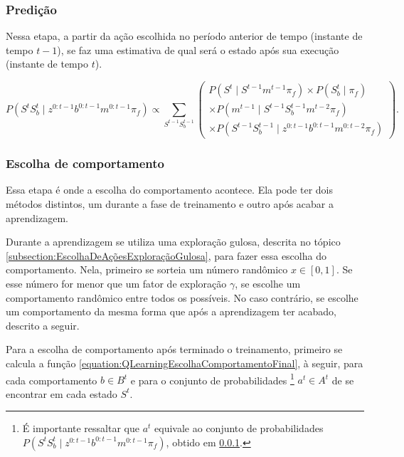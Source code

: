 \subsubsection{Predição} \label{subsubsection:ModeloFinalPredicao}

Nessa etapa, a partir da ação escolhida no período anterior de tempo (instante de tempo $ t-1 $), se faz uma estimativa de qual será o estado após sua execução (instante de tempo $ t $).

\begin{equation}
    P \left( S^t S_b^t \mid z^{0: t-1} b^{0: t-1} m^{0: t-1} \pi_f \right) \propto \sum\limits_{S^{t-1} S_b^{t-1}}
        \left(
            \begin{array}{l}
                P \left( S^t \mid S^{t-1} m^{t-1} \pi_f \right) \times P \left( S_b^t \mid \pi_f \right) \\
                \times P \left( m^{t-1} \mid S^{t-1} S_b^{t-1} m^{t-2} \pi_f \right)\\
                \times P \left( S^{t-1} S_b^{t-1} \mid z^{0: t-1} b^{0: t-1} m^{0: t-2} \pi_f \right)
            \end{array}
        \right).
\end{equation}


\subsubsection{Escolha de comportamento}

Essa etapa é onde a escolha do comportamento acontece. Ela pode ter dois métodos distintos, um durante a fase de treinamento e outro após acabar a aprendizagem.

Durante a aprendizagem se utiliza uma exploração gulosa, descrita no tópico \ref{subsection:EscolhaDeAçõesExploraçãoGulosa}, para fazer essa escolha do comportamento. Nela, primeiro se sorteia um número randômico $ x \in [0,1] $. Se esse número for menor que um fator de exploração $ \gamma $, se escolhe um comportamento randômico entre todos os possíveis. No caso contrário, se escolhe um comportamento da mesma forma que após a aprendizagem ter acabado, descrito a seguir.

Para a escolha de comportamento após terminado o treinamento, primeiro se calcula a função \ref{equation:QLearningEscolhaComportamentoFinal}, à seguir, para cada comportamento $ b \in B^t $ e para o conjunto de probabilidades%
\footnote{É importante ressaltar que $ a^t $ equivale ao conjunto de probabilidades $ P \left( S^t S_b^t \mid z^{0: t-1} b^{0: t-1} m^{0: t-1} \pi_f \right) $, obtido em \ref{subsubsection:ModeloFinalPredicao}.%
} $ a^t \in A^t $ de se encontrar em cada estado $ S^t $.

